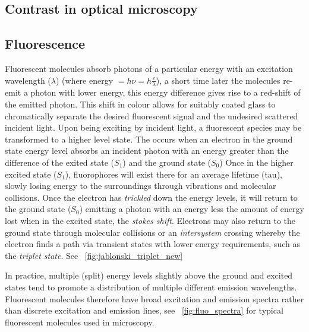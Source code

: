 \subsection{Contrast in optical microscopy}
\subsection{Fluorescence}

Fluorescent molecules absorb photons of a particular energy with an excitation wavelength (\(\lambda \)) (where energy \(= h \nu = h \frac{c}{\lambda}\)), a short time later the molecules re-emit a photon with lower energy, this energy difference gives rise to a red-shift of the emitted photon.
This shift in colour allows for suitably coated glass to chromatically separate the desired fluorescent signal and the undesired scattered incident light.
Upon being exciting by incident light, a fluorescent species may be transformed to a higher level state.
The occurs when an electron in the ground state energy level absorbs an incident photon with an energy greater than the difference of the exited state (\(S_1\)) and the ground state (\(S_0\))
Once in the higher excited state (\(S_1\)), \gls{fluorophore}s will exist there for an average lifetime (\gls{tau}), slowly losing energy to the surroundings through vibrations and molecular collisions.
Once the electron has \emph{trickled} down the energy levels, it will return to the ground state (\(S_0 \)) emitting a photon with an energy less the amount of energy lost when in the excited state, the \emph{\Gls{stokes shift}}.
Electrons may also return to the ground state through molecular collisions or an \emph{intersystem} crossing whereby the electron finds a path via transient states with lower energy requirements, such as the \emph{triplet state}.
See \figurename~\ref{fig:jablonski_triplet_new}

In practice, multiple (split) energy levels slightly above the ground and excited states tend to promote a distribution of multiple different emission wavelengths.
Fluorescent molecules therefore have broad excitation and emission spectra rather than discrete excitation and emission lines, see \figurename~\ref{fig:fluo_spectra} for typical fluorescent molecules used in microscopy.

